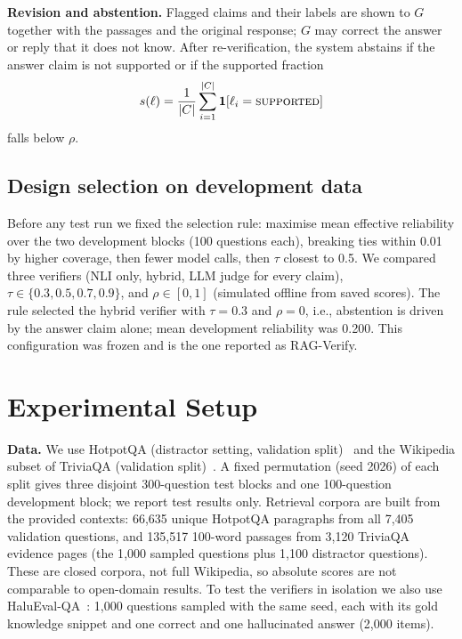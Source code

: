 \documentclass[conference]{IEEEtran}
\begin{document}
\textbf{Revision and abstention.} Flagged claims and their labels are shown to $G$ together with the passages and the original response; $G$ may correct the answer or reply that it does not know. After re-verification, the system abstains if the answer claim is not supported or if the supported fraction
\begin{equation}
s(\ell)=\frac{1}{|C|}\sum_{i=1}^{|C|}\mathbf{1}[\ell_i=\textsc{supported}]
\end{equation}
falls below $\rho$.

\subsection{Design selection on development data}
Before any test run we fixed the selection rule: maximise mean effective reliability over the two development blocks (100 questions each), breaking ties within 0.01 by higher coverage, then fewer model calls, then $\tau$ closest to 0.5. We compared three verifiers (NLI only, hybrid, LLM judge for every claim), $\tau\in\{0.3,0.5,0.7,0.9\}$, and $\rho\in[0,1]$ (simulated offline from saved scores). The rule selected the hybrid verifier with $\tau=0.3$ and $\rho=0$, i.e., abstention is driven by the answer claim alone; mean development reliability was 0.200. This configuration was frozen and is the one reported as RAG-Verify.

\section{Experimental Setup}
\textbf{Data.} We use HotpotQA (distractor setting, validation split)~\cite{yang2018hotpotqa} and the Wikipedia subset of TriviaQA (validation split)~\cite{joshi2017triviaqa}. A fixed permutation (seed 2026) of each split gives three disjoint 300-question test blocks and one 100-question development block; we report test results only. Retrieval corpora are built from the provided contexts: 66{,}635 unique HotpotQA paragraphs from all 7{,}405 validation questions, and 135{,}517 100-word passages from 3{,}120 TriviaQA evidence pages (the 1{,}000 sampled questions plus 1{,}100 distractor questions). These are closed corpora, not full Wikipedia, so absolute scores are not comparable to open-domain results. To test the verifiers in isolation we also use HaluEval-QA~\cite{li2023halueval}: 1{,}000 questions sampled with the same seed, each with its gold knowledge snippet and one correct and one hallucinated answer (2{,}000 items).
\end{document}
